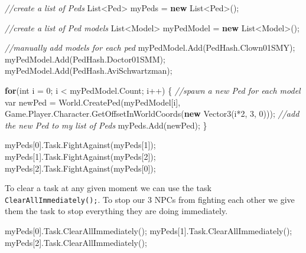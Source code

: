 \documentclass[
  openany]{book}
\newenvironment{Shaded}{\begin{snugshade}}{\end{snugshade}}
\newcommand{\CommentTok}[1]{\textcolor[rgb]{0.56,0.35,0.01}{\textit{#1}}}
\newcommand{\DataTypeTok}[1]{\textcolor[rgb]{0.13,0.29,0.53}{#1}}
\newcommand{\DecValTok}[1]{\textcolor[rgb]{0.00,0.00,0.81}{#1}}
\newcommand{\FunctionTok}[1]{\textcolor[rgb]{0.00,0.00,0.00}{#1}}
\newcommand{\KeywordTok}[1]{\textcolor[rgb]{0.13,0.29,0.53}{\textbf{#1}}}
\newcommand{\NormalTok}[1]{#1}
\begin{document}
\begin{Shaded}
\begin{Highlighting}[]
\CommentTok{//create a list of Peds}
\NormalTok{List<Ped> myPeds = }\KeywordTok{new}\NormalTok{ List<Ped>();}

\CommentTok{//create a list of Ped models }
\NormalTok{List<Model> myPedModel = }\KeywordTok{new}\NormalTok{ List<Model>();}

\CommentTok{//manually add models for each ped}
\NormalTok{myPedModel.}\FunctionTok{Add}\NormalTok{(PedHash.}\FunctionTok{Clown01SMY}\NormalTok{);}
\NormalTok{myPedModel.}\FunctionTok{Add}\NormalTok{(PedHash.}\FunctionTok{Doctor01SMM}\NormalTok{);}
\NormalTok{myPedModel.}\FunctionTok{Add}\NormalTok{(PedHash.}\FunctionTok{AviSchwartzman}\NormalTok{);}


\KeywordTok{for}\NormalTok{(}\DataTypeTok{int}\NormalTok{ i = }\DecValTok{0}\NormalTok{; i < myPedModel.}\FunctionTok{Count}\NormalTok{; i++)}
\NormalTok{\{}
    \CommentTok{//spawn a new Ped for each model}
    \DataTypeTok{var}\NormalTok{ newPed = World.}\FunctionTok{CreatePed}\NormalTok{(myPedModel[i], Game.}\FunctionTok{Player}\NormalTok{.}\FunctionTok{Character}\NormalTok{.}\FunctionTok{GetOffsetInWorldCoords}\NormalTok{(}\KeywordTok{new} \FunctionTok{Vector3}\NormalTok{(i*}\DecValTok{2}\NormalTok{, }\DecValTok{3}\NormalTok{, }\DecValTok{0}\NormalTok{)));}
    \CommentTok{//add the new Ped to my list of Peds}
\NormalTok{    myPeds.}\FunctionTok{Add}\NormalTok{(newPed);}
\NormalTok{\}}

\NormalTok{myPeds[}\DecValTok{0}\NormalTok{].}\FunctionTok{Task}\NormalTok{.}\FunctionTok{FightAgainst}\NormalTok{(myPeds[}\DecValTok{1}\NormalTok{]);}
\NormalTok{myPeds[}\DecValTok{1}\NormalTok{].}\FunctionTok{Task}\NormalTok{.}\FunctionTok{FightAgainst}\NormalTok{(myPeds[}\DecValTok{2}\NormalTok{]);}
\NormalTok{myPeds[}\DecValTok{2}\NormalTok{].}\FunctionTok{Task}\NormalTok{.}\FunctionTok{FightAgainst}\NormalTok{(myPeds[}\DecValTok{0}\NormalTok{]);}
\end{Highlighting}
\end{Shaded}

To clear a task at any given moment we can use the task \texttt{ClearAllImmediately();}. To stop our 3 NPCs from fighting each other we give them the task to stop everything they are doing immediately.

\begin{Shaded}
\begin{Highlighting}[]
\NormalTok{myPeds[}\DecValTok{0}\NormalTok{].}\FunctionTok{Task}\NormalTok{.}\FunctionTok{ClearAllImmediately}\NormalTok{();}
\NormalTok{myPeds[}\DecValTok{1}\NormalTok{].}\FunctionTok{Task}\NormalTok{.}\FunctionTok{ClearAllImmediately}\NormalTok{();}
\NormalTok{myPeds[}\DecValTok{2}\NormalTok{].}\FunctionTok{Task}\NormalTok{.}\FunctionTok{ClearAllImmediately}\NormalTok{();}
\end{Highlighting}
\end{Shaded}
\end{document}
